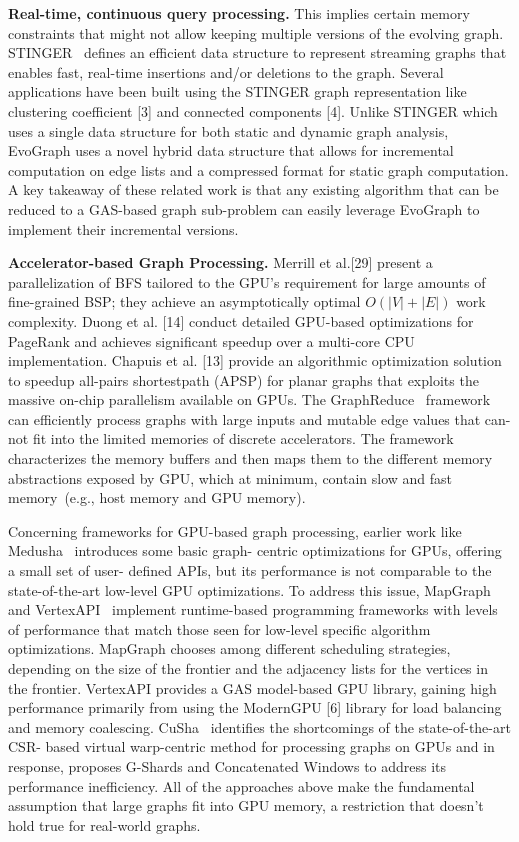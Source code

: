 \textbf{Real-time, continuous query processing.} This implies certain memory constraints that might not allow keeping multiple versions of the evolving graph. STINGER~\cite{stinger} defines an efficient data structure to represent streaming graphs that enables fast, real-time insertions and/or deletions to the graph. Several applications have been built using the STINGER graph representation like clustering coefficient [3] and connected components [4]. Unlike STINGER which uses a single data structure for both static and dynamic graph analysis, EvoGraph uses a novel hybrid data structure that allows for incremental computation on edge lists and a compressed format for static graph computation.  A key takeaway of these related work is that any existing algorithm that can be reduced to a GAS-based graph sub-problem can easily leverage EvoGraph to implement their incremental versions.


\textbf{Accelerator-based Graph Processing.}
Merrill et al.[29] present a parallelization of BFS tailored to the GPU’s requirement for large amounts of fine-grained BSP; they achieve an asymptotically optimal $O(|V | + |E|)$ work complexity. Duong et al. [14] conduct detailed GPU-based optimizations for PageRank and achieves significant speedup over a multi-core CPU implementation. Chapuis et al. [13] provide an algorithmic optimization solution to speedup all-pairs shortestpath (APSP) for planar graphs that exploits the massive on-chip parallelism available on GPUs. 	The GraphReduce~\cite{GR} framework can efficiently process graphs with large inputs and mutable edge values that can-not fit into the limited memories of discrete accelerators. The framework characterizes the memory buffers and then maps them to the different memory abstractions exposed by GPU, which at minimum, contain slow and fast memory~\cite{nemu}(e.g., host memory and GPU memory). 		 

Concerning frameworks for GPU-based graph processing, earlier work like Medusha~\cite{medusa} introduces some basic graph- centric optimizations for GPUs, offering a small set of user- defined APIs, but its performance is not comparable to the state-of-the-art low-level GPU optimizations. To address this issue, MapGraph~\cite{mapgraph} and VertexAPI~\cite{vertexapi} implement runtime-based programming frameworks with levels of performance that match those seen for low-level specific algorithm optimizations. MapGraph chooses among different scheduling strategies, depending on the size of the frontier and the adjacency lists for the vertices in the frontier. VertexAPI provides a GAS model-based GPU library, gaining high performance primarily from using the ModernGPU [6] library for load balancing and memory coalescing. CuSha~\cite{cusha} identifies the shortcomings of the state-of-the-art CSR- based virtual warp-centric method for processing graphs on GPUs and in response, proposes G-Shards and Concatenated Windows to address its performance inefficiency. All of the approaches above make the fundamental assumption that large graphs fit into GPU memory, a restriction that doesn't hold true for real-world graphs.

